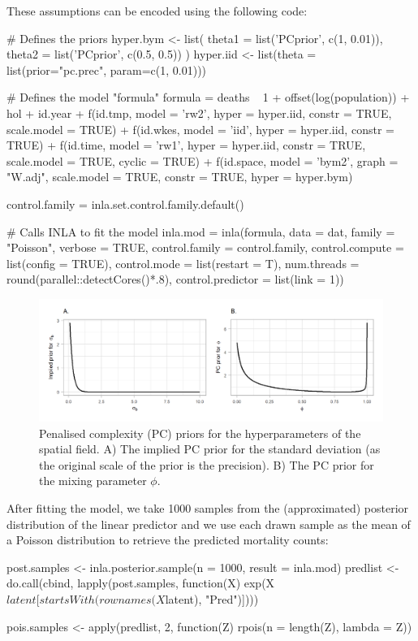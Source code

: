 These assumptions can be encoded using the following code:
\begin{example}
# Defines the priors
hyper.bym <- list(
	theta1 = list('PCprior', c(1, 0.01)), 
	theta2 = list('PCprior', c(0.5, 0.5))
)
hyper.iid <- list(theta = list(prior="pc.prec", param=c(1, 0.01)))

# Defines the model "formula"
formula = 
	deaths ~ 1 + offset(log(population)) + hol + id.year + 
	f(id.tmp, model = 'rw2', hyper = hyper.iid, constr = TRUE, scale.model = TRUE) +
	f(id.wkes, model = 'iid', hyper = hyper.iid, constr = TRUE) + 
	f(id.time, model = 'rw1', hyper = hyper.iid, constr = TRUE, scale.model = TRUE,
	 cyclic = TRUE) +
	f(id.space, model = 'bym2', graph = "W.adj", scale.model = TRUE, constr = TRUE, 
	hyper = hyper.bym)
	
control.family = inla.set.control.family.default()

# Calls INLA to fit the model
inla.mod = inla(formula,
	data = dat,
	family = "Poisson",  
	verbose = TRUE, 
	control.family = control.family,
	control.compute = list(config = TRUE), 
	control.mode = list(restart = T),
	num.threads = round(parallel::detectCores()*.8), 
	control.predictor = list(link = 1))
\end{example}

\begin{figure}[t!]
	\centering
	\includegraphics{PCpriors.png}
	\caption{Penalised complexity (PC) priors for the hyperparameters of the spatial field. A) The implied PC prior for the standard deviation (as the original scale of the prior is the precision). B) The PC prior for the mixing parameter $\phi$.}
	\label{fig:priors}
\end{figure}

After fitting the model, we take 1000 samples from the (approximated) posterior distribution of the linear predictor and we use each drawn sample as the mean of a Poisson distribution to retrieve the predicted mortality counts:

\begin{example}
post.samples <- inla.posterior.sample(n = 1000, result = inla.mod)
predlist <- do.call(cbind, lapply(post.samples, function(X)
exp(X$latent[startsWith(rownames(X$latent), "Pred")])))
	
pois.samples <- apply(predlist, 2, function(Z) rpois(n = length(Z), lambda = Z))
\end{example}

